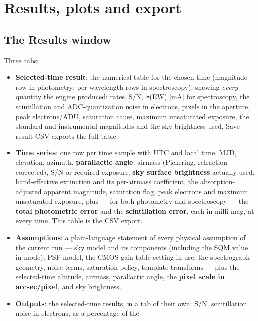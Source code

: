 \section{Results, plots and export}
\label{sec:results}

\subsection{The Results window}

Three tabs:
\begin{itemize}
  \item \textbf{Selected-time result}: the numerical table for the chosen
        time (magnitude row in photometry; per-wavelength rows in
        spectroscopy), showing \emph{every} quantity the engine produced:
        rates, S/N, $\sigma$(EW) [m\AA] for spectroscopy, the
        scintillation and ADC-quantization noise in electrons, pixels in
        the aperture, peak electrons/ADU, saturation cause, maximum
        unsaturated exposure, the standard and instrumental magnitudes and
        the sky brightness used. \textsf{Save result CSV} exports the full
        table.
  \item \textbf{Time series}: one row per time sample with UTC and local
        time, MJD, elevation, azimuth, \textbf{parallactic angle}, airmass
        (Pickering, refraction-corrected), S/N or required exposure,
        \textbf{sky surface brightness} actually used, band-effective
        extinction and its per-airmass coefficient, the
        absorption-adjusted apparent magnitude, saturation flag, peak
        electrons and maximum unsaturated exposure, plus --- for both
        photometry and spectroscopy --- the \textbf{total photometric
        error} and the \textbf{scintillation error}, each in milli-mag, at
        every time. This table is the CSV export.
  \item \textbf{Assumptions}: a plain-language statement of every physical
        assumption of the current run --- sky model and its components
        (including the SQM value in  mode), PSF model, the CMOS
        gain-table setting in use, the spectrograph geometry, noise terms,
        saturation policy, template transforms --- plus the selected-time
        altitude, airmass, parallactic angle, the \textbf{pixel scale in
        arcsec/pixel}, and sky brightness.
  \item \textbf{Outputs}: the selected-time results, in a tab of their own:
        S/N, scintillation noise in electrons, as a percentage of the

\end{itemize}

